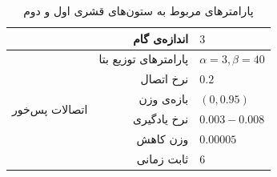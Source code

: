 \documentclass[12pt]{report}
\begin{document}
\begin{table}[p]
{\begin{tabular}{|rrrl|}
		\multicolumn{1}{|r|}{}                                          & \multicolumn{2}{r|}{اندازه‌ی گام}                                                                                          & $3$                       \\ \hline
		\multicolumn{1}{|r|}{\multirow{6}{*}{اتصالات پس‌خور}}        & \multicolumn{2}{r|}{پارامتر‌های توزیع بتا}                                                                                 & $\alpha=3, \beta=40$               \\ \cline{2-4} 
		\multicolumn{1}{|r|}{}                                          & \multicolumn{2}{r|}{نرخ اتصال}                                                                                             & $0.2$                     \\ \cline{2-4} 
		\multicolumn{1}{|r|}{}                                          & \multicolumn{2}{r|}{بازه‌ی وزن}                                                                                            & $(0, 0.95)$               \\ \cline{2-4} 
		\multicolumn{1}{|r|}{}                                          & \multicolumn{2}{r|}{نرخ یادگیری}                                                                                           & $0.003 - 0.008$           \\ \cline{2-4} 
		\multicolumn{1}{|r|}{}                                          & \multicolumn{2}{r|}{وزن کاهش}                                                                                              & $0.00005$                \\ \cline{2-4} 
		\multicolumn{1}{|r|}{}                                          & \multicolumn{2}{r|}{ثابت زمانی}                                                                                            & $6$                       \\ \hline
	\end{tabular}}
\caption{\label{table:parameters-cc-1-2}پارامتر‌های مربوط به ستون‌های قشری اول و دوم}
\end{table}
\end{document}
